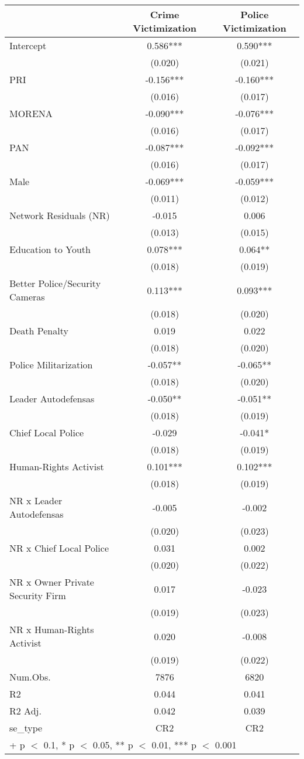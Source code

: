 \begin{table}[H]
\centering
\begin{tabular}[t]{lcc}
\toprule
  & Crime Victimization & Police Victimization\\
\midrule
Intercept & 0.586*** & 0.590***\\
 & (0.020) & (0.021)\\
PRI & -0.156*** & -0.160***\\
 & (0.016) & \vphantom{2}(0.017)\\
MORENA & -0.090*** & -0.076***\\
 & (0.016) & \vphantom{1}(0.017)\\
PAN & -0.087*** & -0.092***\\
 & (0.016) & (0.017)\\
Male & -0.069*** & -0.059***\\
 & (0.011) & (0.012)\\
Network Residuals (NR) & -0.015 & 0.006\\
 & (0.013) & (0.015)\\
Education to Youth & 0.078*** & 0.064**\\
 & (0.018) & \vphantom{3}(0.019)\\
Better Police/Security Cameras & 0.113*** & 0.093***\\
 & (0.018) & \vphantom{2}(0.020)\\
Death Penalty & 0.019 & 0.022\\
 & (0.018) & \vphantom{1}(0.020)\\
Police Militarization & -0.057** & -0.065**\\
 & (0.018) & (0.020)\\
Leader Autodefensas & -0.050** & -0.051**\\
 & (0.018) & \vphantom{2}(0.019)\\
Chief Local Police & -0.029 & -0.041*\\
 & (0.018) & \vphantom{1}(0.019)\\
Human-Rights Activist & 0.101*** & 0.102***\\
 & (0.018) & (0.019)\\
NR x Leader Autodefensas & -0.005 & -0.002\\
 & (0.020) & (0.023)\\
NR x Chief Local Police & 0.031 & 0.002\\
 & (0.020) & (0.022)\\
NR x Owner Private  Security Firm & 0.017 & -0.023\\
 & (0.019) & (0.023)\\
NR x Human-Rights Activist & 0.020 & -0.008\\
 & (0.019) & (0.022)\\
\midrule
Num.Obs. & 7876 & 6820\\
R2 & 0.044 & 0.041\\
R2 Adj. & 0.042 & 0.039\\
se\_type & CR2 & CR2\\
\bottomrule
\multicolumn{3}{l}{\textsuperscript{} + p $<$ 0.1, * p $<$ 0.05, ** p $<$ 0.01, *** p $<$ 0.001}\\
\end{tabular}
\end{table}
